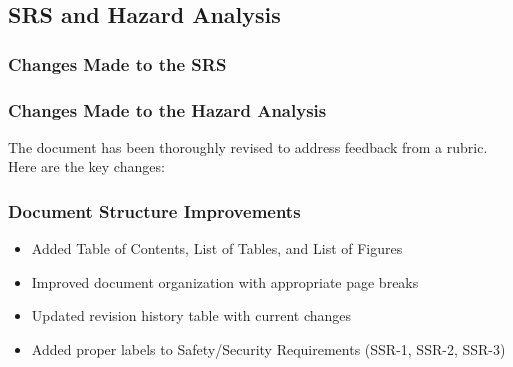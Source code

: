 \documentclass{article}
\begin{document}

\subsection{SRS and Hazard Analysis}

\subsubsection{Changes Made to the SRS}


\subsubsection{Changes Made to the Hazard Analysis}

The document has been thoroughly revised to address feedback from a rubric. Here are the key changes:

\subsubsection{Document Structure Improvements}
\begin{itemize}
  \item Added Table of Contents, List of Tables, and List of Figures
  \item Improved document organization with appropriate page breaks
  \item Updated revision history table with current changes
  \item Added proper labels to Safety/Security Requirements (SSR-1, SSR-2, SSR-3)
\end{itemize}
\end{document}
